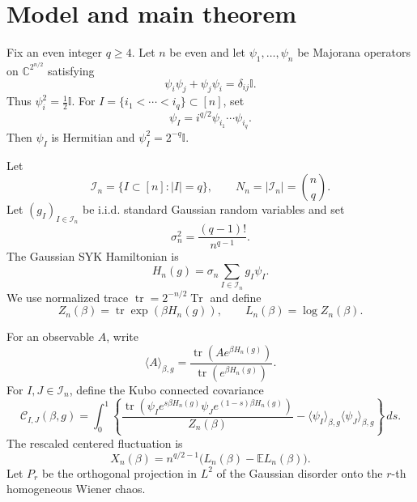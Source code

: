 \documentclass[11pt]{article}
\newcommand{\E}{\mathbb{E}}
\newcommand{\Tr}{\operatorname{Tr}}
\newcommand{\tr}{\operatorname{tr}}
\newcommand{\I}{\mathbb{I}}
\newcommand{\C}{\mathbb{C}}
\newcommand{\calI}{\mathcal{I}}
\newcommand{\dd}{\,d}
\begin{document}
\section{Model and main theorem}

Fix an even integer $q\geq4$.  Let $n$ be even and let
$\psi_1,\ldots,\psi_n$ be Majorana operators on $\C^{2^{n/2}}$ satisfying
\begin{equation}\label{eq:majorana-relations}
  \psi_i\psi_j+\psi_j\psi_i=\delta_{ij}\I.
\end{equation}
Thus $\psi_i^2=\frac12\I$.  For $I=\{i_1<\cdots<i_q\}\subset[n]$, set
\begin{equation}\label{eq:psiI}
  \psi_I=i^{q/2}\psi_{i_1}\cdots\psi_{i_q}.
\end{equation}
Then $\psi_I$ is Hermitian and $\psi_I^2=2^{-q}\I$.

Let
\begin{equation}\label{eq:calI-Nn}
  \calI_n=\{I\subset[n]: |I|=q\},
  \qquad
  N_n=|\calI_n|=\binom{n}{q}.
\end{equation}
Let $(g_I)_{I\in\calI_n}$ be i.i.d. standard Gaussian random variables and set
\begin{equation}\label{eq:sigma}
  \sigma_n^2=\frac{(q-1)!}{n^{q-1}}.
\end{equation}
The Gaussian SYK Hamiltonian is
\begin{equation}\label{eq:Hn}
  H_n(g)=\sigma_n\sum_{I\in\calI_n}g_I\psi_I.
\end{equation}
We use normalized trace $\tr=2^{-n/2}\Tr$ and define
\begin{equation}\label{eq:Zn-Ln}
  Z_n(\beta)=\tr\exp(\beta H_n(g)),
  \qquad
  L_n(\beta)=\log Z_n(\beta).
\end{equation}

For an observable $A$, write
\begin{equation}\label{eq:thermal-average}
  \langle A\rangle_{\beta,g}
  =
  \frac{\tr(Ae^{\beta H_n(g)})}{\tr(e^{\beta H_n(g)})}.
\end{equation}
For $I,J\in\calI_n$, define the Kubo connected covariance
\begin{equation}\label{eq:kubo-covariance}
  \mathcal C_{I,J}(\beta,g)
  =
  \int_0^1
  \left\{
    \frac{
      \tr\left(\psi_I e^{s\beta H_n(g)}
      \psi_J e^{(1-s)\beta H_n(g)}\right)
    }{Z_n(\beta)}
    -
    \langle\psi_I\rangle_{\beta,g}
    \langle\psi_J\rangle_{\beta,g}
  \right\}
  \dd s.
\end{equation}
The rescaled centered fluctuation is
\begin{equation}\label{eq:Xn}
  X_n(\beta)=n^{q/2-1}\bigl(L_n(\beta)-\E L_n(\beta)\bigr).
\end{equation}
Let $P_r$ be the orthogonal projection in $L^2$ of the Gaussian disorder onto
the $r$-th homogeneous Wiener chaos.
\end{document}
